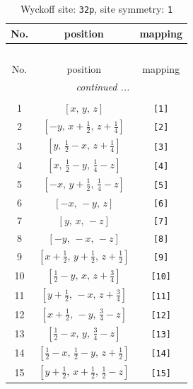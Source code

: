 \documentclass[fleqn,8pt]{jsarticle}
\begin{document}
\renewcommand{\arraystretch}{1.2}
\begin{longtable}{ccc}
\caption{Wyckoff site: {\tt 32p}, site symmetry: {\tt 1}}
 \\
 \hline \hline
No. & position & mapping \\ \hline \endfirsthead

\multicolumn{2}{l}{\tablename\ \thetable{}} \\
 \hline \hline
No. & position & mapping \\ \hline \endhead

 \hline \hline
\multicolumn{2}{r}{\footnotesize\it continued ...} \\ \endfoot

 \hline \hline
\multicolumn{2}{r}{} \\ \endlastfoot

1 & $\left[ x,\, y,\, z \right]$ & {\tt [1]} \\ \hline
2 & $\left[ - y,\, x + \frac{1}{2},\, z + \frac{1}{4} \right]$ & {\tt [2]} \\ \hline
3 & $\left[ y,\, \frac{1}{2} - x,\, z + \frac{1}{4} \right]$ & {\tt [3]} \\ \hline
4 & $\left[ x,\, \frac{1}{2} - y,\, \frac{1}{4} - z \right]$ & {\tt [4]} \\ \hline
5 & $\left[ - x,\, y + \frac{1}{2},\, \frac{1}{4} - z \right]$ & {\tt [5]} \\ \hline
6 & $\left[ - x,\, - y,\, z \right]$ & {\tt [6]} \\ \hline
7 & $\left[ y,\, x,\, - z \right]$ & {\tt [7]} \\ \hline
8 & $\left[ - y,\, - x,\, - z \right]$ & {\tt [8]} \\ \hline
9 & $\left[ x + \frac{1}{2},\, y + \frac{1}{2},\, z + \frac{1}{2} \right]$ & {\tt [9]} \\ \hline
10 & $\left[ \frac{1}{2} - y,\, x,\, z + \frac{3}{4} \right]$ & {\tt [10]} \\ \hline
11 & $\left[ y + \frac{1}{2},\, - x,\, z + \frac{3}{4} \right]$ & {\tt [11]} \\ \hline
12 & $\left[ x + \frac{1}{2},\, - y,\, \frac{3}{4} - z \right]$ & {\tt [12]} \\ \hline
13 & $\left[ \frac{1}{2} - x,\, y,\, \frac{3}{4} - z \right]$ & {\tt [13]} \\ \hline
14 & $\left[ \frac{1}{2} - x,\, \frac{1}{2} - y,\, z + \frac{1}{2} \right]$ & {\tt [14]} \\ \hline
15 & $\left[ y + \frac{1}{2},\, x + \frac{1}{2},\, \frac{1}{2} - z \right]$ & {\tt [15]} \\ \hline

\end{longtable}
\end{document}
